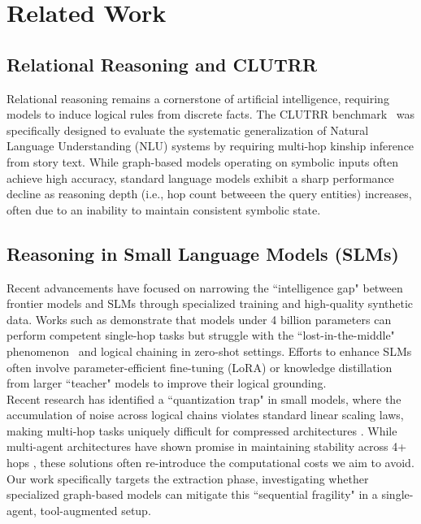 \documentclass[
]{ceurart}
\begin{document}
\section{Related Work}

\subsection{Relational Reasoning and CLUTRR}
Relational reasoning remains a cornerstone of artificial intelligence, requiring models to induce logical rules from discrete facts. The CLUTRR benchmark~\cite{sinha2019clutrr} was specifically designed to evaluate the systematic generalization of Natural Language Understanding (NLU) systems by requiring multi-hop kinship inference from story text. While graph-based models \cite{rgcn, gcn} operating on symbolic inputs often achieve high accuracy, standard language models exhibit a sharp performance decline as reasoning depth (i.e., hop count betweeen the query entities) increases, often due to an inability to maintain consistent symbolic state.

\subsection{Reasoning in Small Language Models (SLMs)}
Recent advancements have focused on narrowing the ``intelligence gap" between frontier models and SLMs through specialized training and high-quality synthetic data. Works such as \cite{slms_good, slms_good1} demonstrate that models under 4 billion parameters can perform competent single-hop tasks but struggle with the ``lost-in-the-middle" phenomenon~\cite{Liu2023} and logical chaining in zero-shot settings. Efforts to enhance SLMs often involve parameter-efficient fine-tuning (LoRA) or knowledge distillation from larger ``teacher" models to improve their logical grounding.\\
Recent research has identified a ``quantization trap" in small models, where the accumulation of noise across logical chains violates standard linear scaling laws, making multi-hop tasks uniquely difficult for compressed architectures \cite{slms_good2, slms_good1}. While multi-agent architectures have shown promise in maintaining stability across 4+ hops \cite{Sadeddine2025}, these solutions often re-introduce the computational costs we aim to avoid. Our work specifically targets the extraction phase, investigating whether specialized graph-based models can mitigate this ``sequential fragility" in a single-agent, tool-augmented setup.
\end{document}
